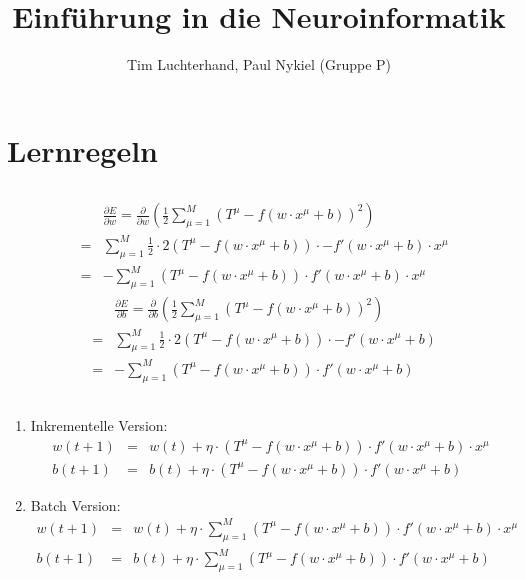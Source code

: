 \documentclass[DIN, pagenumber=false, fontsize=11pt, parskip=half]{scrartcl}
\title{Einführung in die Neuroinformatik}
\author{Tim Luchterhand, Paul Nykiel (Gruppe P)}
\begin{document}
    \maketitle
    \section{Lernregeln}
    \subsection{}
    \begin{eqnarray*}
        && \frac{\partial E}{\partial w} = \frac{\partial}{\partial w}\left( \frac{1}{2} \sum_{\mu=1}^M {(T^\mu - f(w \cdot x^\mu +b))}^2 \right) \\
        &=& \sum_{\mu=1}^M \frac{1}{2} \cdot 2 (T^\mu - f(w \cdot x^\mu + b)) \cdot -f'(w \cdot x^\mu + b) \cdot x^\mu \\
        &=& - \sum_{\mu=1}^M (T^\mu - f(w \cdot x^\mu + b)) \cdot f'(w \cdot x^\mu + b) \cdot x^\mu
    \end{eqnarray*}
    \begin{eqnarray*}
        && \frac{\partial E}{\partial b} = \frac{\partial}{\partial b}\left( \frac{1}{2} \sum_{\mu=1}^M {(T^\mu - f(w \cdot x^\mu +b))}^2 \right) \\
        &=& \sum_{\mu=1}^M \frac{1}{2} \cdot 2 (T^\mu - f(w \cdot x^\mu + b)) \cdot -f'(w \cdot x^\mu + b)\\
        &=& - \sum_{\mu=1}^M (T^\mu - f(w \cdot x^\mu + b)) \cdot f'(w \cdot x^\mu + b)
    \end{eqnarray*}
    \subsection{}
    \begin{enumerate}[label=(\alph*)]
        \item Inkrementelle Version:
            \begin{eqnarray*}
                w(t+1) &=& w(t) + \eta \cdot (T^\mu - f(w \cdot x^\mu + b)) \cdot f'(w \cdot x^\mu + b) \cdot x^\mu \\
                b(t+1) &=& b(t) + \eta \cdot  (T^\mu - f(w \cdot x^\mu + b)) \cdot f'(w \cdot x^\mu + b) 
            \end{eqnarray*}
        \item Batch Version:
            \begin{eqnarray*}
                w(t+1) &=& w(t) + \eta \cdot \sum_{\mu=1}^M (T^\mu - f(w \cdot x^\mu + b)) \cdot f'(w \cdot x^\mu + b) \cdot x^\mu \\
                b(t+1) &=& b(t) + \eta \cdot \sum_{\mu=1}^M (T^\mu - f(w \cdot x^\mu + b)) \cdot f'(w \cdot x^\mu + b) 
            \end{eqnarray*}
    \end{enumerate}
\end{document}
